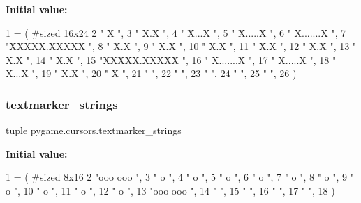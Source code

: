 {\bfseries Initial value\+:}
\begin{DoxyCode}
1 =  (               \textcolor{comment}{#sized 16x24}
2  \textcolor{stringliteral}{"     X          "},
3  \textcolor{stringliteral}{"    X.X         "},
4  \textcolor{stringliteral}{"   X...X        "},
5  \textcolor{stringliteral}{"  X.....X       "},
6  \textcolor{stringliteral}{" X.......X      "},
7  \textcolor{stringliteral}{"XXXXX.XXXXX     "},
8  \textcolor{stringliteral}{"    X.X         "},
9  \textcolor{stringliteral}{"    X.X         "},
10  \textcolor{stringliteral}{"    X.X         "},
11  \textcolor{stringliteral}{"    X.X         "},
12  \textcolor{stringliteral}{"    X.X         "},
13  \textcolor{stringliteral}{"    X.X         "},
14  \textcolor{stringliteral}{"    X.X         "},
15  \textcolor{stringliteral}{"XXXXX.XXXXX     "},
16  \textcolor{stringliteral}{" X.......X      "},
17  \textcolor{stringliteral}{"  X.....X       "},
18  \textcolor{stringliteral}{"   X...X        "},
19  \textcolor{stringliteral}{"    X.X         "},
20  \textcolor{stringliteral}{"     X          "},
21  \textcolor{stringliteral}{"                "},
22  \textcolor{stringliteral}{"                "},
23  \textcolor{stringliteral}{"                "},
24  \textcolor{stringliteral}{"                "},
25  \textcolor{stringliteral}{"                "},
26 )
\end{DoxyCode}
\mbox{\label{namespacepygame_1_1cursors_a44fb57310f6f4f5a8a008acdfda21d2c}} 
\subsubsection{\texorpdfstring{textmarker\+\_\+strings}{textmarker\_strings}}
{\footnotesize\ttfamily tuple pygame.\+cursors.\+textmarker\+\_\+strings}

{\bfseries Initial value\+:}
\begin{DoxyCode}
1 =  (               \textcolor{comment}{#sized 8x16}
2  \textcolor{stringliteral}{"ooo ooo "},
3  \textcolor{stringliteral}{"   o    "},
4  \textcolor{stringliteral}{"   o    "},
5  \textcolor{stringliteral}{"   o    "},
6  \textcolor{stringliteral}{"   o    "},
7  \textcolor{stringliteral}{"   o    "},
8  \textcolor{stringliteral}{"   o    "},
9  \textcolor{stringliteral}{"   o    "},
10  \textcolor{stringliteral}{"   o    "},
11  \textcolor{stringliteral}{"   o    "},
12  \textcolor{stringliteral}{"   o    "},
13  \textcolor{stringliteral}{"ooo ooo "},
14  \textcolor{stringliteral}{"        "},
15  \textcolor{stringliteral}{"        "},
16  \textcolor{stringliteral}{"        "},
17  \textcolor{stringliteral}{"        "},
18 )
\end{DoxyCode}
\mbox{\label{namespacepygame_1_1cursors_ae6ff5b89a2625015133293e6cce576d9}} 
